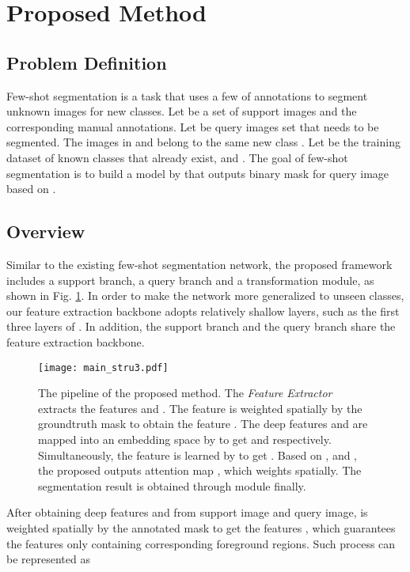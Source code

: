 \documentclass[runningheads]{llncs}
\begin{document}
\section{Proposed Method}
\subsection{Problem Definition}

Few-shot segmentation is a task that uses a few of annotations to segment unknown images for new classes. Let  be a set of support images and the corresponding manual annotations. Let  be query images set that needs to be segmented. 
The images in  and  belong to the same new class . Let  be the training dataset of known classes that already exist, and  . The goal of few-shot segmentation is to build a model  by  that outputs binary mask  for query image  based on .



\subsection{Overview}
Similar to the existing few-shot segmentation network, the proposed framework includes a support branch, a query branch and a transformation module, as shown in Fig. \ref{fig1}. In order to make the network more generalized to unseen classes, our feature extraction backbone adopts relatively shallow layers, such as the first three layers of \cite{ref_resnet}. In addition, the support branch and the query branch share the feature extraction backbone.

\begin{figure}
\texttt{[image: main\_stru3.pdf]}
\caption{The pipeline of the proposed method. The \textit{Feature  Extractor} extracts the features  and . The feature  is weighted spatially by the groundtruth mask  to obtain the feature . The deep features  and  are mapped into an embedding space by  to get  and  respectively. Simultaneously, the feature  is learned by  to get . Based on ,  and , the proposed  outputs attention map , which weights  spatially. The segmentation result is obtained through  module finally. }\label{fig1}
\end{figure}

After obtaining deep features  and  from support image and query image,  is weighted spatially by the annotated mask  to get the features , which guarantees the features  only containing corresponding foreground regions. Such process can be represented as
\end{document}
